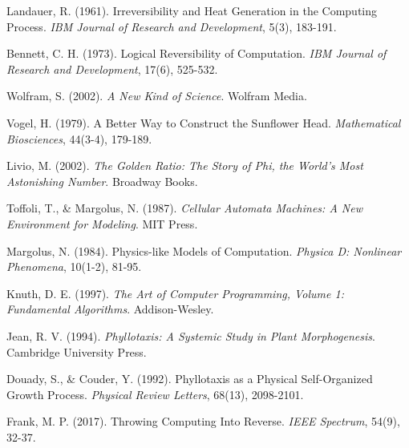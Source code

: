 \documentclass[11pt]{article}
\begin{document}
\begin{thebibliography}{99}

Landauer, R. (1961). Irreversibility and Heat Generation in the Computing Process. \textit{IBM Journal of Research and Development}, 5(3), 183-191.

Bennett, C. H. (1973). Logical Reversibility of Computation. \textit{IBM Journal of Research and Development}, 17(6), 525-532.

Wolfram, S. (2002). \textit{A New Kind of Science}. Wolfram Media.

Vogel, H. (1979). A Better Way to Construct the Sunflower Head. \textit{Mathematical Biosciences}, 44(3-4), 179-189.

Livio, M. (2002). \textit{The Golden Ratio: The Story of Phi, the World's Most Astonishing Number}. Broadway Books.

Toffoli, T., \& Margolus, N. (1987). \textit{Cellular Automata Machines: A New Environment for Modeling}. MIT Press.

Margolus, N. (1984). Physics-like Models of Computation. \textit{Physica D: Nonlinear Phenomena}, 10(1-2), 81-95.

Knuth, D. E. (1997). \textit{The Art of Computer Programming, Volume 1: Fundamental Algorithms}. Addison-Wesley.

Jean, R. V. (1994). \textit{Phyllotaxis: A Systemic Study in Plant Morphogenesis}. Cambridge University Press.

Douady, S., \& Couder, Y. (1992). Phyllotaxis as a Physical Self-Organized Growth Process. \textit{Physical Review Letters}, 68(13), 2098-2101.

Frank, M. P. (2017). Throwing Computing Into Reverse. \textit{IEEE Spectrum}, 54(9), 32-37.

\end{thebibliography}
\end{document}
